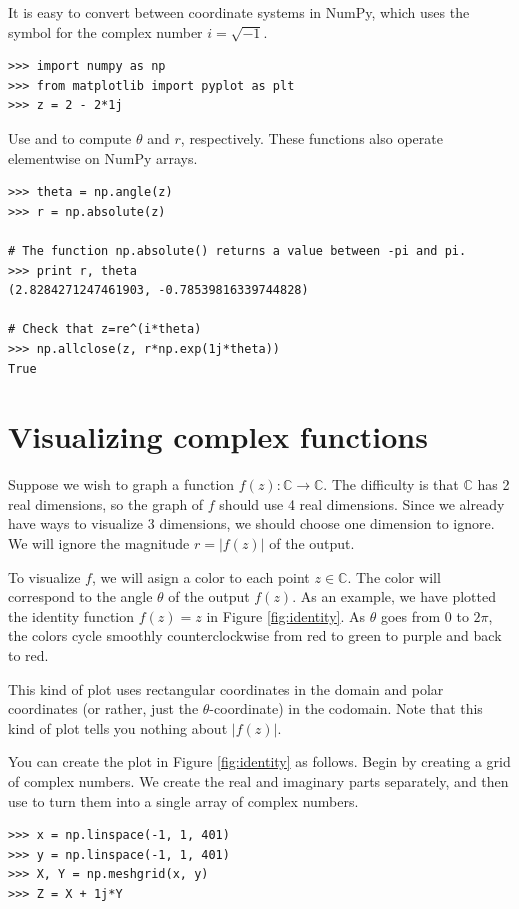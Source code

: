 It is easy to convert between coordinate systems in NumPy, which uses the symbol  for the complex number $i=\sqrt{-1}$.
\begin{lstlisting}
>>> import numpy as np
>>> from matplotlib import pyplot as plt
>>> z = 2 - 2*1j
\end{lstlisting}
Use  and  to compute $\theta$ and $r$, respectively.
These functions also operate elementwise on NumPy arrays.
\begin{lstlisting}
>>> theta = np.angle(z)
>>> r = np.absolute(z)

# The function np.absolute() returns a value between -pi and pi.
>>> print r, theta
(2.8284271247461903, -0.78539816339744828)

# Check that z=re^(i*theta)
>>> np.allclose(z, r*np.exp(1j*theta))
True
\end{lstlisting}

\section*{Visualizing complex functions}
Suppose we wish to graph a function $f(z): \mathbb{C} \rightarrow \mathbb{C}$. 
The difficulty is that $\mathbb{C}$ has 2 real dimensions, so the graph of $f$ should use 4 real dimensions.
 Since we already have ways to visualize 3 dimensions, we should choose one dimension to ignore. 
 We will ignore the magnitude $r = |f(z)|$ of the output.

To visualize $f$, we will asign a color to each point $z \in \mathbb{C}$. 
The color will correspond to the angle $\theta$ of the output $f(z)$. 
As an example, we have plotted the identity function $f(z)=z$ in Figure \ref{fig:identity}.
As $\theta$ goes from 0 to $2\pi$, the colors cycle smoothly counterclockwise from red to green to purple and back to red.

This kind of plot uses rectangular coordinates in the domain and polar coordinates (or rather, just the $\theta$-coordinate) in the codomain.
Note that this kind of plot tells you nothing about $|f(z)|$.

You can create the plot in Figure \ref{fig:identity} as follows.
Begin by creating a grid of complex numbers.
We create the real and imaginary parts separately, and then use  to turn them into a single array of complex numbers.
\begin{lstlisting}
>>> x = np.linspace(-1, 1, 401)
>>> y = np.linspace(-1, 1, 401)
>>> X, Y = np.meshgrid(x, y)
>>> Z = X + 1j*Y
\end{lstlisting}

